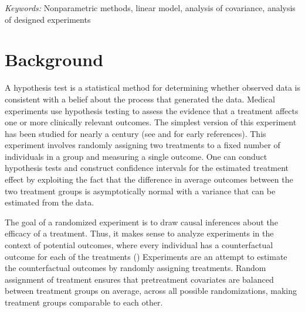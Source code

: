 \documentclass[12pt]{article}
\begin{document}
\noindent%
{\it Keywords:}  Nonparametric methods, linear model, analysis of covariance, analysis of designed experiments
\vfill

\newpage
{} %
\section{Background}
A hypothesis test is a statistical method for determining whether observed data is consistent with a belief about the process that generated the data.
Medical experiments use hypothesis testing to assess the evidence that a treatment affects one or more clinically relevant outcomes.
The simplest version of this experiment has been studied for nearly a century (see \cite{fisher_design_1935} and \cite[1990 translation]{neyman_application_1923} for early references).
This experiment involves randomly assigning two treatments to a fixed number of individuals in a group and measuring a single outcome.
One can conduct hypothesis tests and construct confidence intervals for the estimated treatment effect
by exploiting the fact that the difference in average outcomes between the two treatment groups is asymptotically normal with a variance that can be estimated from the data.


The goal of a randomized experiment is to draw causal inferences about the efficacy of a treatment.
Thus, it makes sense to analyze experiments in the context of potential outcomes, where every individual has a counterfactual outcome for each of the treatments (\cite{holland_1986_statistics})
Experiments are an attempt to estimate the counterfactual outcomes by randomly assigning treatments.
Random assignment of treatment ensures that pretreatment covariates are balanced between treatment groups on average, across all possible randomizations, making treatment groups comparable to each other.
\end{document}
